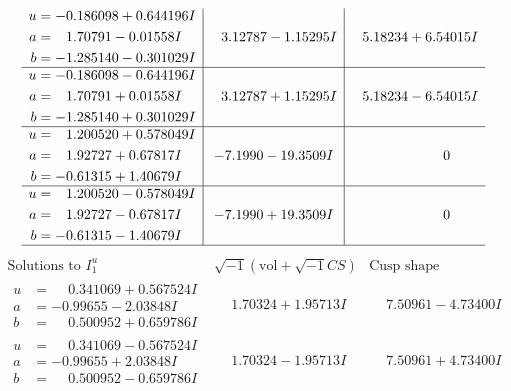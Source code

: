 \documentclass[1p]{elsarticle_modified}
\theoremstyle{definition}
\newcommand{\I}{\sqrt{-1}}
\begin{document}
$$\begin{array}{c|c|c}
\begin{aligned}
u &= -0.186098 + 0.644196 I \\
a &= \phantom{-}1.70791 - 0.01558 I \\
b &= -1.285140 - 0.301029 I\end{aligned}
 & \phantom{-}3.12787 - 1.15295 I & \phantom{-}5.18234 + 6.54015 I \\ \hline\begin{aligned}
u &= -0.186098 - 0.644196 I \\
a &= \phantom{-}1.70791 + 0.01558 I \\
b &= -1.285140 + 0.301029 I\end{aligned}
 & \phantom{-}3.12787 + 1.15295 I & \phantom{-}5.18234 - 6.54015 I \\ \hline\begin{aligned}
u &= \phantom{-}1.200520 + 0.578049 I \\
a &= \phantom{-}1.92727 + 0.67817 I \\
b &= -0.61315 + 1.40679 I\end{aligned}
 & -7.1990 - 19.3509 I & \phantom{-0.000000 } 0 \\ \hline\begin{aligned}
u &= \phantom{-}1.200520 - 0.578049 I \\
a &= \phantom{-}1.92727 - 0.67817 I \\
b &= -0.61315 - 1.40679 I\end{aligned}
 & -7.1990 + 19.3509 I & \phantom{-0.000000 } 0\\
 \hline 
 \end{array}$$\newpage$$\begin{array}{c|c|c}  
\text{Solutions to }I^u_{1}& \I (\text{vol} + \sqrt{-1}CS) & \text{Cusp shape}\\
 \hline 
\begin{aligned}
u &= \phantom{-}0.341069 + 0.567524 I \\
a &= -0.99655 - 2.03848 I \\
b &= \phantom{-}0.500952 + 0.659786 I\end{aligned}
 & \phantom{-}1.70324 + 1.95713 I & \phantom{-}7.50961 - 4.73400 I \\ \hline\begin{aligned}
u &= \phantom{-}0.341069 - 0.567524 I \\
a &= -0.99655 + 2.03848 I \\
b &= \phantom{-}0.500952 - 0.659786 I\end{aligned}
 & \phantom{-}1.70324 - 1.95713 I & \phantom{-}7.50961 + 4.73400 I \\ \hline\begin{aligned}

\end{aligned}
\end{array}$$
\end{document}
